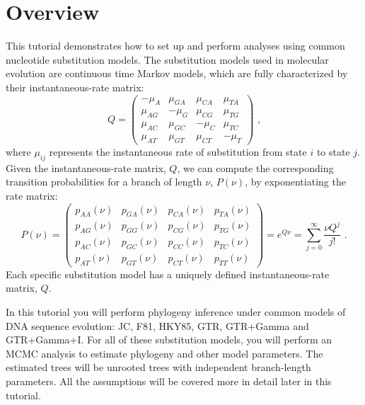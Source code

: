 \section{Overview}


This tutorial demonstrates how to set up and perform analyses using common nucleotide substitution models. 
The substitution models used in molecular evolution are continuous time Markov models, which are fully characterized by their instantaneous-rate matrix:
\begin{equation*}
Q = \begin{pmatrix} -\mu_A & \mu_{GA} & \mu_{CA} & \mu_{TA} \\
\mu_{AG} & -\mu_G  & \mu_{CG} & \mu_{TG} \\
\mu_{AC} & \mu_{GC} & -\mu_C  & \mu_{TC} \\
\mu_{AT} & \mu_{GT} & \mu_{CT} & -\mu_T 
\end{pmatrix} \mbox{  ,}
\end{equation*}
where $\mu_{ij}$ represents the instantaneous rate of substitution from state $i$ to state $j$. Given the instantaneous-rate matrix, $Q$, we can compute the corresponding transition probabilities for a branch of length $\nu$, $P(\nu)$, by exponentiating the rate matrix:
\begin{equation*}
P(\nu) = \begin{pmatrix}          
p_{AA}(\nu) & p_{GA}(\nu) & p_{CA}(\nu) & p_{TA}(\nu) \\
p_{AG}(\nu) & p_{GG}(\nu) & p_{CG}(\nu) & p_{TG}(\nu) \\
p_{AC}(\nu) & p_{GC}(\nu) & p_{CC}(\nu) & p_{TC}(\nu) \\
p_{AT}(\nu) & p_{GT}(\nu) & p_{CT}(\nu) & p_{TT}(\nu)
\end{pmatrix} = e^{Q\nu} = \sum_{j=0}^\infty\frac{\nu Q^j}{j!} \mbox{  .}
\end{equation*}
Each specific substitution model has a uniquely defined instantaneous-rate matrix, $Q$.


In this tutorial you will perform phylogeny inference under common models of DNA sequence evolution: JC, F81, HKY85, GTR, GTR+Gamma and GTR+Gamma+I.
For all of these substitution models, you will perform an MCMC analysis to estimate phylogeny and other model parameters.
The estimated trees will be unrooted trees with independent branch-length parameters. 
All the assumptions will be covered more in detail later in this tutorial.

